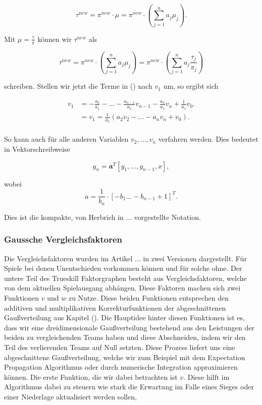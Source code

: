 \documentclass[12pt,a4paper]{scrartcl}
\numberwithin{equation}{section}
\begin{document}
  \begin{equation}
   \tau^{new} = \pi^{new} \cdot \mu = \pi^{new} \cdot (\sum_{j=1}^n a_j \mu_j).
  \end{equation}

  Mit $\mu = \frac{\tau}{\pi}$ können wir $\tau^{new}$ als
  
  \begin{equation}
   \tau^{new} = \pi^{new} \cdot (\sum_{j=1}^n a_j \mu_j) = \pi^{new} \cdot(\sum_{j=1}^n a_j \frac{\tau_j}{\pi_j})
  \end{equation}
  
  schreiben. Stellen wir jetzt die Terme in () nach $v_1$ um, so ergibt sich
  
  \begin{equation}
   \begin{split}
   v_1 &= - \frac{a_2}{a_1} - ...- \frac{a_{n-1}}{a_1} v_{n-1} - \frac{a_n}{a_1} v_n + \frac{1}{a_1}v_0. \\
   &= v_1 = \frac{1}{a_1}( a_2v_2 -...-a_nv_n + v_0). \\
    \end{split}
  \end{equation}

  So kann auch für alle anderen Variablen $v_2,...,v_n$ verfahren werden. Dies bedeutet in Vektorschreibweise
  
  \begin{equation}
   y_n = \mathbf{a}^T [y_1,...,y_{n-1},x],
  \end{equation}

  wobei 
  \begin{equation}
	  a = \frac{1}{b_n} \cdot [-b_1 ... -b_{n-1} +1]^T.
  \end{equation}

  Dies ist die kompakte, von Herbrich in ... vorgestellte Notation.

  \subsubsection{Gaussche Vergleichsfaktoren}
  
  Die Vergleichsfaktoren wurden im Artikel ... in zwei Versionen dargestellt. Für Spiele bei denen Unentschieden vorkommen können und für solche ohne. 
  Der untere Teil des Trueskill Faktorgraphen besteht aus Vergleichsfaktoren, welche von dem aktuellen Spielausgang abhängen. 
  Diese Faktoren machen sich zwei Funktionen $v$ und $w$ zu Nutze. Diese beiden Funktionen entsprechen den additiven und multiplikativen Korrekturfunktionen der abgeschnittenen 
  Gaußverteilung aus Kapitel (). Die Hauptidee hinter diesen Funktionen ist es, dass wir eine dreidimensionale Gaußverteilung bestehend
  aus den Leistungen der beiden zu vergleichenden Teams haben und diese Abschneiden, indem wir den Teil des verlierenden Teams auf Null setzten. 
  Diese Prozess liefert uns eine abgeschnittene Gaußverteilung, welche wir zum Beispiel mit dem Expectation Propagation Algorithmus oder durch numerische Integration 
  approximieren können. 
  Die erste Funktion, die wir dabei betrachten ist $v$. Diese hilft im Algorithmus dabei zu steuern wie stark die Erwartung im Falle eines Sieges oder einer 
  Niederlage aktualisiert werden sollen,
  
\end{document}
